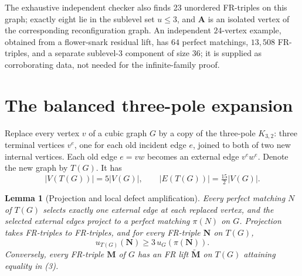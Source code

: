 \documentclass[11pt]{article}
\newtheorem{lemma}{Lemma}
\begin{document}
The exhaustive independent checker also finds 23 unordered FR-triples on this graph; exactly eight lie in the sublevel set $u\le3$, and $\mathbf A$ is an isolated vertex of the corresponding reconfiguration graph. An independent $24$-vertex example, obtained from a flower-snark residual lift, has $64$ perfect matchings, $13{,}508$ FR-triples, and a separate sublevel-$3$ component of size $36$; it is supplied as corroborating data, not needed for the infinite-family proof.

\section{The balanced three-pole expansion}
Replace every vertex $v$ of a cubic graph $G$ by a copy of the three-pole $K_{3,2}$: three terminal vertices $v^e$, one for each old incident edge $e$, joined to both of two new internal vertices. Each old edge $e=vw$ becomes an external edge $v^ew^e$. Denote the new graph by $T(G)$. It has
\[
 |V(T(G))|=5|V(G)|,
 \qquad |E(T(G))|=\tfrac{15}{2}|V(G)|.
\]
\begin{lemma}[Projection and local defect amplification]\label{lem:project}
Every perfect matching $N$ of $T(G)$ selects exactly one external edge at each replaced vertex, and the selected external edges project to a perfect matching $\pi(N)$ on $G$. Projection takes FR-triples to FR-triples, and for every FR-triple $\mathbf N$ on $T(G)$,
\[
 u_{T(G)}(\mathbf N)\ge3\,u_G(\pi(\mathbf N)). \tag{3}
\]
Conversely, every FR-triple $\mathbf M$ of $G$ has an FR lift $\widetilde{\mathbf M}$ on $T(G)$ attaining equality in (3).
\end{lemma}
\end{document}
